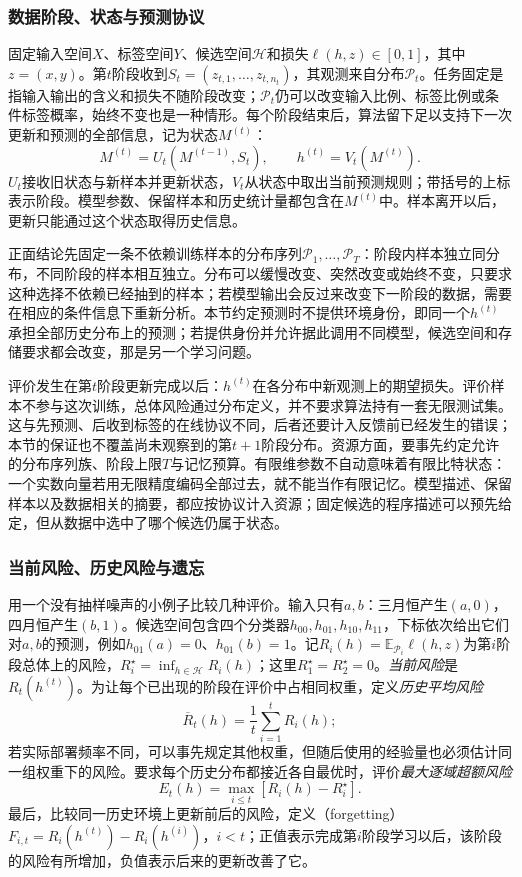 \subsubsection{数据阶段、状态与预测协议}

固定输入空间$X$、标签空间$Y$、候选空间$\mathcal H$和损失$\ell(h,z)\in[0,1]$，其中$z=(x,y)$。第$t$阶段收到$S_t=(z_{t,1},\ldots,z_{t,n_t})$，其观测来自分布$\mathcal P_t$。任务固定是指输入输出的含义和损失不随阶段改变；$\mathcal P_t$仍可以改变输入比例、标签比例或条件标签概率，始终不变也是一种情形。每个阶段结束后，算法留下足以支持下一次更新和预测的全部信息，记为状态$M^{(t)}$：
\[
 M^{(t)}=U_t(M^{(t-1)},S_t),\qquad
 h^{(t)}=V_t(M^{(t)}).
\]
$U_t$接收旧状态与新样本并更新状态，$V_t$从状态中取出当前预测规则；带括号的上标表示阶段。模型参数、保留样本和历史统计量都包含在$M^{(t)}$中。样本离开以后，更新只能通过这个状态取得历史信息。

正面结论先固定一条不依赖训练样本的分布序列$\mathcal P_1,\ldots,\mathcal P_T$：阶段内样本独立同分布，不同阶段的样本相互独立。分布可以缓慢改变、突然改变或始终不变，只要求这种选择不依赖已经抽到的样本；若模型输出会反过来改变下一阶段的数据，需要在相应的条件信息下重新分析。本节约定预测时不提供环境身份，即同一个$h^{(t)}$承担全部历史分布上的预测；若提供身份并允许据此调用不同模型，候选空间和存储要求都会改变，那是另一个学习问题。

评价发生在第$t$阶段更新完成以后：$h^{(t)}$在各分布中新观测上的期望损失。评价样本不参与这次训练，总体风险通过分布定义，并不要求算法持有一套无限测试集。这与先预测、后收到标签的在线协议不同，后者还要计入反馈前已经发生的错误；本节的保证也不覆盖尚未观察到的第$t+1$阶段分布。资源方面，要事先约定允许的分布序列族、阶段上限$T$与记忆预算。有限维参数不自动意味着有限比特状态：一个实数向量若用无限精度编码全部过去，就不能当作有限记忆。模型描述、保留样本以及数据相关的摘要，都应按协议计入资源；固定候选的程序描述可以预先给定，但从数据中选中了哪个候选仍属于状态。

\subsubsection{当前风险、历史风险与遗忘}
\label{sec:continual-risks}

用一个没有抽样噪声的小例子比较几种评价。输入只有$a,b$：三月恒产生$(a,0)$，四月恒产生$(b,1)$。候选空间包含四个分类器$h_{00},h_{01},h_{10},h_{11}$，下标依次给出它们对$a,b$的预测，例如$h_{01}(a)=0$、$h_{01}(b)=1$。记$R_i(h)=\mathbb E_{\mathcal P_i}\ell(h,z)$为第$i$阶段总体上的风险，$R_i^\star=\inf_{h\in\mathcal H}R_i(h)$；这里$R_1^\star=R_2^\star=0$。\emph{当前风险}是$R_t(h^{(t)})$。为让每个已出现的阶段在评价中占相同权重，定义\emph{历史平均风险}
\begin{equation}
 \overline R_t(h)=\frac1t\sum_{i=1}^tR_i(h) ;
 \label{eq:continual-average-risk}
\end{equation}
若实际部署频率不同，可以事先规定其他权重，但随后使用的经验量也必须估计同一组权重下的风险。要求每个历史分布都接近各自最优时，评价\emph{最大逐域超额风险}
\[
 E_t(h)=\max_{i\leq t}[R_i(h)-R_i^\star].
\]
最后，比较同一历史环境上更新前后的风险，定义（forgetting）$F_{i,t}=R_i(h^{(t)})-R_i(h^{(i)})$，$i<t$；正值表示完成第$i$阶段学习以后，该阶段的风险有所增加，负值表示后来的更新改善了它。


